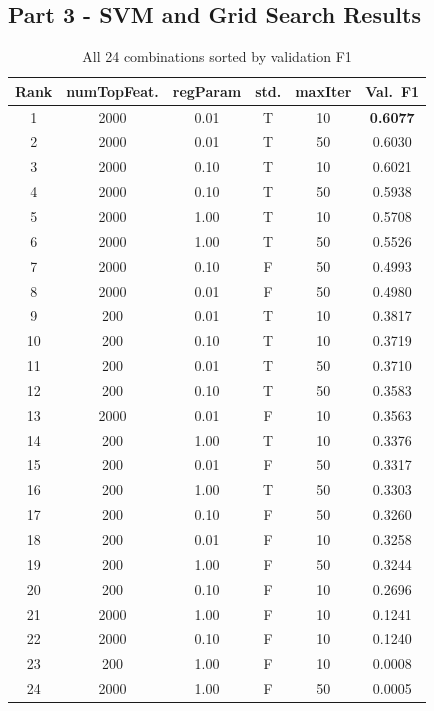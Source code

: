 \documentclass[11pt,a4paper]{extarticle}
\begin{document}
\subsection{Part 3 - SVM and Grid Search Results}
\begin{table}[htbp]
\centering
\caption{All 24 combinations sorted by validation F1}
\label{tab:gs}
\small
\begin{tabular}{ccccc c}
\toprule
\textbf{Rank} & \textbf{numTopFeat.} & \textbf{regParam} & \textbf{std.} & \textbf{maxIter} & \textbf{Val.\ F1} \\
\midrule
1 & 2000 & 0.01 & T & 10 & \textbf{0.6077} \\
2 & 2000 & 0.01 & T & 50 & 0.6030 \\
3 & 2000 & 0.10 & T & 10 & 0.6021 \\
4 & 2000 & 0.10 & T & 50 & 0.5938 \\
5 & 2000 & 1.00 & T & 10 & 0.5708 \\
6 & 2000 & 1.00 & T & 50 & 0.5526 \\
7 & 2000 & 0.10 & F & 50 & 0.4993 \\
8 & 2000 & 0.01 & F & 50 & 0.4980 \\
9 & 200  & 0.01 & T & 10 & 0.3817 \\
10 & 200  & 0.10 & T & 10 & 0.3719 \\
11 & 200  & 0.01 & T & 50 & 0.3710 \\
12 & 200  & 0.10 & T & 50 & 0.3583 \\
13 & 2000 & 0.01 & F & 10 & 0.3563 \\
14 & 200  & 1.00 & T & 10 & 0.3376 \\
15 & 200  & 0.01 & F & 50 & 0.3317 \\
16 & 200  & 1.00 & T & 50 & 0.3303 \\
17 & 200  & 0.10 & F & 50 & 0.3260 \\
18 & 200  & 0.01 & F & 10 & 0.3258 \\
19 & 200  & 1.00 & F & 50 & 0.3244 \\
20 & 200  & 0.10 & F & 10 & 0.2696 \\
21 & 2000 & 1.00 & F & 10 & 0.1241 \\
22 & 2000 & 0.10 & F & 10 & 0.1240 \\
23 & 200  & 1.00 & F & 10 & 0.0008 \\
24 & 2000 & 1.00 & F & 50 & 0.0005 \\
\bottomrule
\end{tabular}
\end{table}
\end{document}
